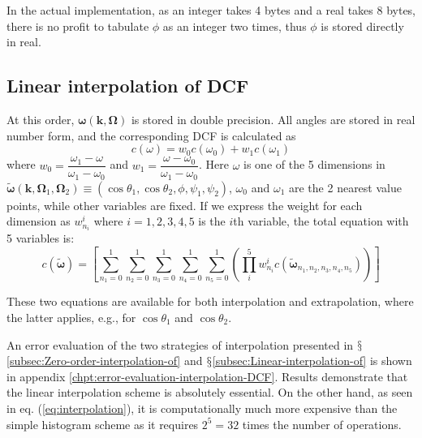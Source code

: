 In the actual implementation, as an integer takes 4 bytes and a real
takes 8 bytes, there is no profit to tabulate $\phi$ as an integer two
times, thus $\phi$ is stored directly in real.

\subsection{Linear interpolation of DCF\label{subsec:Linear-interpolation-of}}

At this order, $\boldsymbol{\omega}(\mathbf{k},\mathbf{\Omega})$
is stored in double precision. All angles are stored in real number form,
and the corresponding \acs{DCF} is calculated as
\begin{equation}
c(\omega)=w_{0}c(\omega_{0})+w_{1}c(\omega_{1})
\end{equation}
where $w_{0}=\dfrac{\omega_{1}-\omega}{\omega_{1}-\omega_{0}}$ and
$w_{1}=\dfrac{\omega-\omega_{0}}{\omega_{1}-\omega_{0}}$. Here
$\omega$ is one of the 5 dimensions in $\tilde{\boldsymbol{\omega}}(\mathbf{k},\mathbf{\Omega}_{1},\mathbf{\Omega}_{2})\equiv(\cos\theta_{1},\cos\theta_{2},\phi,\psi_{1},\psi_{2})$,
$\omega_{0}$ and $\omega_{1}$ are the 2 nearest value points, while
other variables are fixed. If we express the weight for each dimension
as $w_{n_{i}}^{i}$ where $i=1,2,3,4,5$ is the $i$th variable, the
total equation with 5 variables is:
\begin{equation}
c(\tilde{\boldsymbol{\omega}})=\left[\sum_{n_{1}=0}^{1}\sum_{n_{2}=0}^{1}\sum_{n_{3}=0}^{1}\sum_{n_{4}=0}^{1}\sum_{n_{5}=0}^{1}\left(\prod_{i}^{5}w_{n_{i}}^{i}c(\tilde{\boldsymbol{\omega}}_{n_{1},n_{2},n_{3},n_{4},n_{5}})\right)\right]\label{eq:interpolation}
\end{equation}

These two equations are available for both interpolation and extrapolation,
where the latter applies, e.g., for $\cos\theta_{1}$ and $\cos\theta_{2}$. 

An error evaluation of the two strategies of interpolation presented
in $\mathsection$\ref{subsec:Zero-order-interpolation-of} and $\mathsection$\ref{subsec:Linear-interpolation-of}
is shown in appendix \ref{chpt:error-evaluation-interpolation-DCF}.
Results demonstrate that the linear interpolation scheme is absolutely
essential. On the other hand, as seen in eq. (\ref{eq:interpolation}),
it is computationally much more expensive than the simple histogram
scheme as it requires $2^{5}=32$ times the number of operations.

